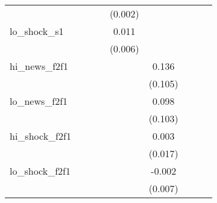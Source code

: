 {\begin{tabular}{l*{8}{c}}
            &                     &                     &                     &     (0.002)         &                     &                     &                     &                     \\
\addlinespace
lo\_shock\_s1 &                     &                     &                     &       0.011\sym{*}  &                     &                     &                     &                     \\
            &                     &                     &                     &     (0.006)         &                     &                     &                     &                     \\
\addlinespace
hi\_news\_f2f1&                     &                     &                     &                     &       0.136         &                     &                     &                     \\
            &                     &                     &                     &                     &     (0.105)         &                     &                     &                     \\
\addlinespace
lo\_news\_f2f1&                     &                     &                     &                     &       0.098         &                     &                     &                     \\
            &                     &                     &                     &                     &     (0.103)         &                     &                     &                     \\
\addlinespace
hi\_shock\_f2f1&                     &                     &                     &                     &       0.003         &                     &                     &                     \\
            &                     &                     &                     &                     &     (0.017)         &                     &                     &                     \\
\addlinespace
lo\_shock\_f2f1&                     &                     &                     &                     &      -0.002         &                     &                     &                     \\
            &                     &                     &                     &                     &     (0.007)         &                     &                     &                     \\

\end{tabular}}
